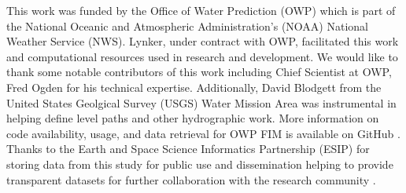 \acknowledgments
%
This work was funded by the Office of Water Prediction (OWP) which is part of the National Oceanic and Atmospheric Administration's (NOAA) National Weather Service (NWS).
Lynker, under contract with OWP, facilitated this work and computational resources used in research and development.
We would like to thank some notable contributors of this work including Chief Scientist at OWP, Fred Ogden for his technical expertise.
Additionally, David Blodgett from the United States Geolgical Survey (USGS) Water Mission Area was instrumental in helping define level paths and other hydrographic work.
More information on code availability, usage, and data retrieval for OWP FIM is available on GitHub \cite{inundationMapping2022}.
Thanks to the Earth and Space Science Informatics Partnership (ESIP) for storing data from this study for public use and dissemination helping to provide transparent datasets for further collaboration with the research community \cite{esipData2022}.
